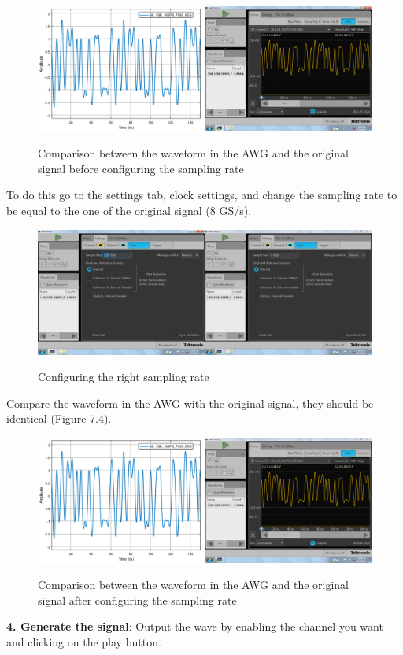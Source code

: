\begin{figure}[h]
	\centering
	\includegraphics[width=\textwidth]{../mtools/sgnToWfm/figures/tutorial2}
	\label{TUT_CompBad}\caption{Comparison between the waveform in the AWG and the original signal before configuring the sampling rate}
\end{figure}
\bigskip
To do this go to the settings tab, clock settings, and change the sampling rate to be equal to the one of the original signal (8 GS/s).

\begin{figure}[h]
	\centering
	\includegraphics[width=\textwidth]{../mtools/sgnToWfm/figures/tutorial3}
	\label{TUT_ConfigSR}\caption{Configuring the right sampling rate}
\end{figure}
\bigskip

Compare the waveform in the AWG with the original signal, they should be identical (Figure 7.4).

\begin{figure}[h]
	\centering
	\includegraphics[width=\textwidth]{../mtools/sgnToWfm/figures/tutorial4}
	\label{TUT_CompGood}\caption{Comparison between the waveform in the AWG and the original signal after configuring the sampling rate}
\end{figure}
\bigskip

\noindent
\textbf{4. Generate the signal}: 
Output the wave by enabling the channel you want and clicking on the play button.


% 